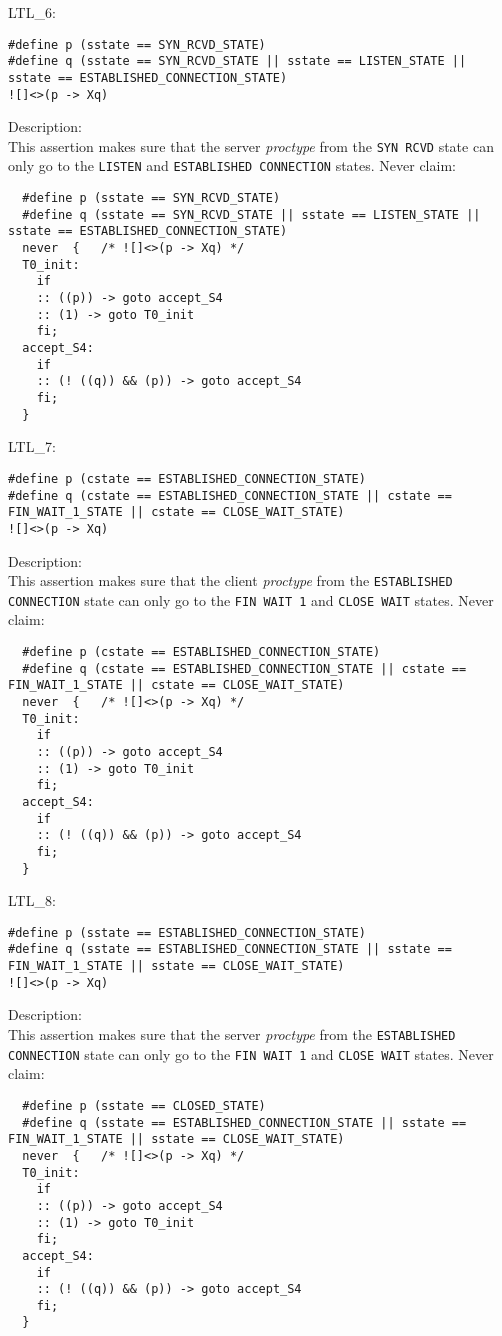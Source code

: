 \documentclass{WigReport}
\begin{document}
LTL\_6:\\
\begin{lstlisting}
#define p (sstate == SYN_RCVD_STATE)
#define q (sstate == SYN_RCVD_STATE || sstate == LISTEN_STATE || sstate == ESTABLISHED_CONNECTION_STATE)
![]<>(p -> Xq)
\end{lstlisting}
Description:\\
This assertion makes sure that the server \textit{proctype} from the \verb|SYN RCVD| state can only go to the \verb|LISTEN| and \verb|ESTABLISHED CONNECTION| states.
Never claim:\\
\begin{lstlisting}
  #define p (sstate == SYN_RCVD_STATE)
  #define q (sstate == SYN_RCVD_STATE || sstate == LISTEN_STATE || sstate == ESTABLISHED_CONNECTION_STATE)
  never  {   /* ![]<>(p -> Xq) */
  T0_init:
    if
    :: ((p)) -> goto accept_S4
    :: (1) -> goto T0_init
    fi;
  accept_S4:
    if
    :: (! ((q)) && (p)) -> goto accept_S4
    fi;
  }
\end{lstlisting}


LTL\_7:\\
\begin{lstlisting}
#define p (cstate == ESTABLISHED_CONNECTION_STATE)
#define q (cstate == ESTABLISHED_CONNECTION_STATE || cstate == FIN_WAIT_1_STATE || cstate == CLOSE_WAIT_STATE)
![]<>(p -> Xq)
\end{lstlisting}
Description:\\
This assertion makes sure that the client \textit{proctype} from the \verb|ESTABLISHED CONNECTION| state can only go to the \verb|FIN WAIT 1| and \verb|CLOSE WAIT| states.
Never claim:\\
\begin{lstlisting}
  #define p (cstate == ESTABLISHED_CONNECTION_STATE)
  #define q (cstate == ESTABLISHED_CONNECTION_STATE || cstate == FIN_WAIT_1_STATE || cstate == CLOSE_WAIT_STATE)
  never  {   /* ![]<>(p -> Xq) */
  T0_init:
    if
    :: ((p)) -> goto accept_S4
    :: (1) -> goto T0_init
    fi;
  accept_S4:
    if
    :: (! ((q)) && (p)) -> goto accept_S4
    fi;
  }
\end{lstlisting}


LTL\_8:\\
\begin{lstlisting}
#define p (sstate == ESTABLISHED_CONNECTION_STATE)
#define q (sstate == ESTABLISHED_CONNECTION_STATE || sstate == FIN_WAIT_1_STATE || sstate == CLOSE_WAIT_STATE)
![]<>(p -> Xq)
\end{lstlisting}
Description:\\
This assertion makes sure that the server \textit{proctype} from the \verb|ESTABLISHED CONNECTION| state can only go to the \verb|FIN WAIT 1| and \verb|CLOSE WAIT| states.
Never claim:\\
\begin{lstlisting}
  #define p (sstate == CLOSED_STATE)
  #define q (sstate == ESTABLISHED_CONNECTION_STATE || sstate == FIN_WAIT_1_STATE || sstate == CLOSE_WAIT_STATE)
  never  {   /* ![]<>(p -> Xq) */
  T0_init:
    if
    :: ((p)) -> goto accept_S4
    :: (1) -> goto T0_init
    fi;
  accept_S4:
    if
    :: (! ((q)) && (p)) -> goto accept_S4
    fi;
  }
\end{lstlisting}
\end{document}
